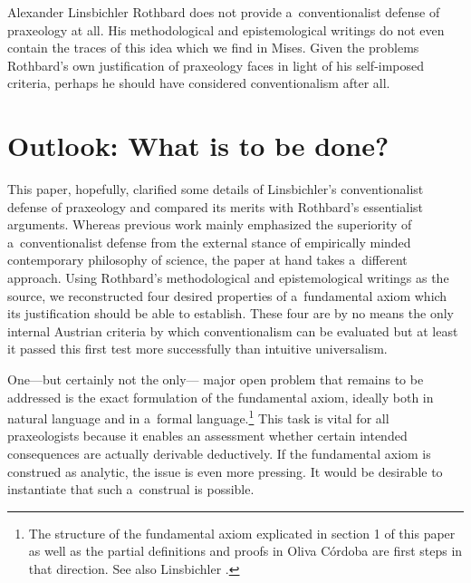 \begin{artengenv}{Alexander Linsbichler}
Rothbard does not provide a~conventionalist defense of praxeology at all. His methodological and epistemological writings do not even contain the traces of this idea which we find in Mises. Given the problems Rothbard's own justification of praxeology faces in light of his self-imposed criteria, perhaps he should have considered conventionalism after all.



\section{Outlook: What is to be done?}

This paper, hopefully, clarified some details of Linsbichler's conventionalist defense of praxeology and compared its merits with Rothbard's essentialist arguments. Whereas previous work 
\parencites[][]{linsbichler_was_2017}[][]{linsbichler_austrian_2021}[][]{lipski_austrian_2021}[][]{scheall_review_2017}[][]{tokumaru_review_2018} %
 mainly emphasized the superiority of a~conventionalist defense from the external stance of empirically minded contemporary philosophy of science, the paper at hand takes a~different approach. Using Rothbard's methodological and epistemological writings as the source, we reconstructed four desired properties of a~fundamental axiom which its justification should be able to establish. These four are by no means the only internal Austrian criteria by which conventionalism can be evaluated but at least it passed this first test more successfully than intuitive universalism.



One---but certainly not the only--- major open problem that remains to be addressed is the exact formulation of the fundamental axiom, ideally both in natural language and in a~formal language.\footnote{The structure of the fundamental axiom explicated in section 1 of this paper as well as the partial definitions and proofs in Oliva Córdoba 
\parencite*[][]{oliva_cordoba_uneasiness_2017} %
 are first steps in that direction. See also Linsbichler 
\parencite*[][]{linsbichler_case_2023}.%
} This task is vital for all praxeologists because it enables an assessment whether certain intended consequences are actually derivable deductively. If the fundamental axiom is construed as analytic, the issue is even more pressing. It would be desirable to instantiate that such a~construal is possible.




\end{artengenv}
